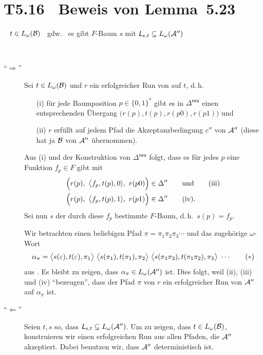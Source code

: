 \documentclass[fontsize=11pt, twoside=false, numbers=autoenddot]{scrbook}
\begin{document}
\goodbreak
\section*{T5.16~ Beweis von Lemma~5.23}

~
$t \in L_\omega(\mathcal{B})$
~gdw.~
es gibt $F$-Baum $s$ mit $\textsf{\textit{L}}_{s,t} \subseteq L_\omega(\mathcal{A}'')$

\par\medskip
{}~
\begin{description}
  \item[{\boldmath"`$\Rightarrow$"'}]
    Sei $t \in L_\omega(\mathcal{B})$ und $r$ ein erfolgreicher Run von \Bmc auf $t$,
    d.\,h.
    \begin{itemize}
      \item[(i)] 
        für jede Baumposition $p \in \{0,1\}^*$ gibt es in $\Delta^{\textsf{neu}}$
        einen entsprechenden Übergang $\big(r(p),t(p),r(p0),r(p1)\big)$ \qquad und
      \item[(ii)]
        $r$ erfüllt auf jedem Pfad die Akzeptanzbedingung
        $c''$ von $\mathcal{A}''$ (diese hat ja $\mathcal{B}$ von $\mathcal{A}''$ übernommen).
    \end{itemize}
    Aus (i) und der Konstruktion von $\Delta^{\textsf{neu}}$ folgt,
    dass es für jedes $p$ eine Funktion $f_p \in F$ gibt mit
    \begin{align*}
      \Big(r(p),~ \big\langle f_p,t(p),0\rangle,~ r(p0)\Big) & \in \Delta''\qquad\text{und} \tag{iii}\\
      \Big(r(p),~ \big\langle f_p,t(p),1\rangle,~ r(p1)\Big) & \in \Delta'' \tag{iv}.
    \end{align*}
    Sei nun $s$ der durch diese $f_p$ bestimmte $F$-Baum,
    d.\,h.\ $s(p) = f_p$.
    
    Wir betrachten einen beliebigen Pfad $\pi = \pi_1\pi_2\pi_3\cdots$
    und das zugehörige $\omega$-Wort
    \[
      \alpha_\pi = 
      \big\langle s(\varepsilon),t(\varepsilon),\pi_1\big\rangle~
      \big\langle s(\pi_1),t(\pi_1),\pi_2\big\rangle~
      \big\langle s(\pi_1\pi_2),t(\pi_1\pi_2),\pi_3\big\rangle~
      \cdots
      \tag{$*$}
    \]
    aus \Lst.
    Es bleibt zu zeigen, dass $\alpha_\pi \in L_\omega(\mathcal{A}'')$ ist.
    Dies folgt, weil (ii), (iii) und (iv) "`bezeugen"', dass der Pfad $\pi$ von $r$
    ein erfolgreicher Run von $\mathcal{A}''$ auf $\alpha_\pi$ ist.
    \par\medskip
  \item[{\boldmath"`$\Leftarrow$"'}]
    Seien $t,s$ so, dass $\textsf{\textit{L}}_{s,t} \subseteq L_\omega(\mathcal{A}'')$.
    Um zu zeigen, dass $t \in L_\omega(\mathcal{B})$, konstruieren wir einen
    erfolgreichen Run aus allen Pfaden, die $\mathcal{A}''$ akzeptiert.
    Dabei benutzen wir, dass $\mathcal{A}''$ deterministisch ist.
    

\end{description}
\end{document}
